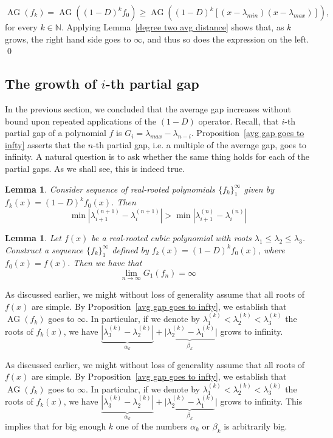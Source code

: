 \documentclass[11pt]{article}
\DeclareMathOperator{\AG}{AG}
\newtheorem{lemma}[theorem]{Lemma}
\begin{document}
\[\AG(f_k)= \AG((1-D)^kf_0)\geq\AG((1-D)^k [(x-\lambda_{min})(x-\lambda_{max})]),\]
for every $k\in\mathbb{N}$. Applying Lemma~\ref{degree two avg distance} shows that, as $k$ grows, the right hand side goes to $\infty$, and thus so does the expression on the left. \qed

\subsection{The growth of $i$-th partial gap}
In the previous section, we concluded that the average gap increases without bound upon repeated applications of the $(1-D)$ operator. Recall, that $i$-th partial gap of a polynomial $f$ is $G_i = \lambda_{max} - \lambda_{n-i}$. Proposition~\ref{avg gap goes to infty} asserts that the $n$-th partial gap, i.e. a multiple of the average gap, goes to infinity. A natural question is to ask whether the same thing holds for each of the partial gaps. As we shall see, this is indeed true.

\begin{lemma}
\label{minimal gap increases}
 Consider sequence of real-rooted polynomials $\{f_k\}_1^\infty$ given by $f_k(x) = (1-D)^k f_0(x)$. Then
 \[\min |\lambda^{(n+1)}_{i+1} - \lambda^{(n+1)}_i | > \min |\lambda^{(n)}_{i+1} - \lambda^{(n)}_i |\]
\end{lemma}

\begin{lemma}
\label{all gaps grow - case with 3}
Let $f(x)$ be a real-rooted cubic polynomial with roots $\lambda_1 \leq \lambda_2 \leq \lambda_3$. Construct a sequence $\{f_k\}_1^\infty$ defined by $f_k(x) = (1-D)^k f_0(x)$, where $f_0(x) = f(x)$. Then we have that
\[\lim_{n\to \infty} G_1 (f_n) = \infty\]
\end{lemma}
\proof
As discussed earlier, we might without loss of generality assume that all roots of $f(x)$ are simple. By Proposition~\ref{avg gap goes to infty}, we establish that $\AG(f_k)$ goes to $\infty$. In particular, if we denote by $\lambda^{(k)}_1 < \lambda^{(k)}_2 < \lambda^{(k)}_3$ the roots of $f_k(x)$, we have $\underbrace{|\lambda^{(k)}_3 - \lambda^{(k)}_2|}_{\alpha_k} + \underbrace{|\lambda^{(k)}_2 - \lambda^{(k)}_1}_{\beta_k}|$ grows to infinity.

As discussed earlier, we might without loss of generality assume that all roots of $f(x)$ are simple. By Proposition~\ref{avg gap goes to infty}, we establish that $\AG(f_k)$ goes to $\infty$. In particular, if we denote by $\lambda^(k)_1 < \lambda^{(k)}_2 < \lambda^{(k)}_3$ the roots of $f_k(x)$, we have $\underbrace{|\lambda^{(k)}_3 - \lambda^{(k)}_2|}_{\alpha_k} + \underbrace{|\lambda^{(k)}_2 - \lambda^{(k)}_1}_{\beta_k}|$ grows to infinity. This implies that for big enough $k$ one of the numbers $\alpha_k$ or $\beta_k$ is arbitrarily big.
\end{document}
